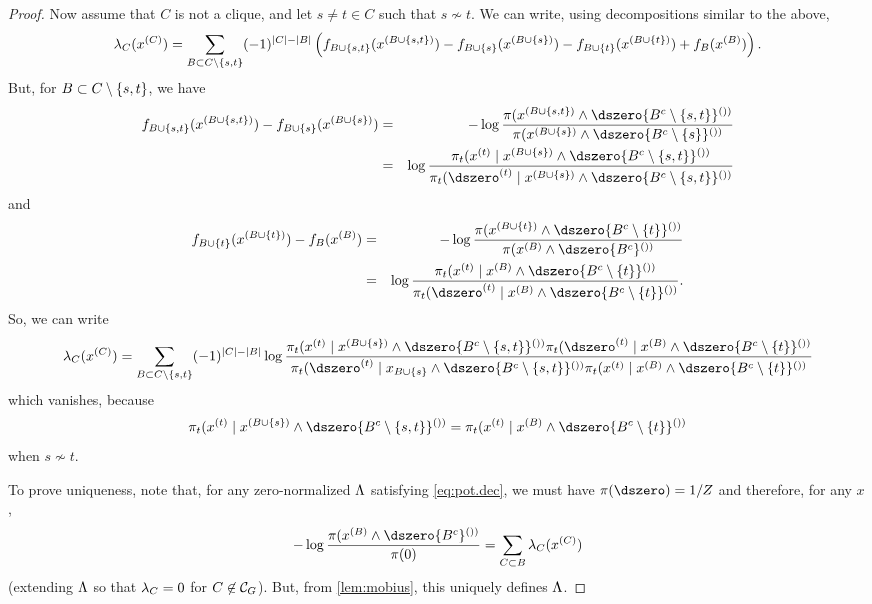 \begin{proof}
Now assume that $C$ is not a clique, and let $s\neq t\in C$ such that
$s\not\sim t$. We can write, using
decompositions similar to the above,
$$
\lambda_C(x^{(C)}) = \sum_{B \subset C\setminus\{s,t\}} (-1)^{|C|-|B|}
\left(f_{B\cup\{s,t\}}(x^{(B\cup\{s,t\})}) - f_{B\cup\{s\}}(x^{(B\cup\{s\})}) - f_{B\cup\{t\}}(x^{(B\cup\{t\})}) +
f_B(x^{(B)})\right).
$$
But, for $B \subset C\setminus\{s,t\}$, we have
\begin{eqnarray*}
f_{B\cup\{s,t\}}(\pe x{B\cup\{s,t\}}) - f_{B\cup\{s\}}(\pe x{B\cup\{s\}}) &=& -
\ln\frac{\pi(\pe x{B\cup\{s,t\}}\wedge
\pe \dszero{B^c\setm\{s,t\}})}{\pi(\pe x{B\cup\{s\}}\wedge \pe \dszero{B^c\setm\{s\}})}
\\
&=& \ln \frac{\pi_t(\pe xt\mid \pe x{B\cup\{s\}}\wedge
\pe \dszero{B^c\setm\{s,t\}})}{\pi_t(\pe \dszero t\mid \pe x{B\cup\{s\}}\wedge
\pe \dszero {B^c\setm\{s,t\}})}
\end{eqnarray*}
and 
\begin{eqnarray*}
f_{B\cup\{t\}}(\pe x{B\cup\{t\}}) - f_{B}(\pe xB) &=& -
\ln\frac{\pi(\pe x{B\cup\{t\}}\wedge
\pe \dszero {B^c\setm\{t\}})}{\pi(\pe x{B}\wedge \pe \dszero{B^c})}
\\
&=& \ln \frac{\pi_t(\pe x t\mid \pe x{B}\wedge
\pe \dszero {B^c\setm\{t\}})}{\pi_t(\pe \dszero t\mid \pe x{B}\wedge
\pe \dszero {B^c\setm\{t\}})}.
\end{eqnarray*}
So, we can write
$$
\la_C(\pe xC) = \sum_{B \sub C\setm\{s,t\}} (-1)^{|C|-|B|}
\ln \frac{\pi_t(\pe x t\mid \pe x {B\cup\{s\}}\wedge
\pe \dszero {B^c\setm\{s,t\}})\pi_t(\pe \dszero t\mid \pe x{B}\wedge
\pe \dszero{B^c\setm\{t\}})}{\pi_t(\pe \dszero t\mid x_{B\cup\{s\}}\wedge
\pe \dszero {B^c\setm\{s,t\}})\pi_t(\pe xt\mid \pe x{B}\wedge
\pe \dszero {B^c\setm\{t\}})}
$$
which vanishes, because
$$
\pi_t(\pe xt\mid \pe x{B\cup\{s\}}\wedge
\pe \dszero{B^c\setm\{s,t\}}) = \pi_t(\pe xt\mid \pe x{B}\wedge
\pe \dszero {B^c\setm\{t\}})
$$
when $s\not \sim t$.

To prove uniqueness, note that, for any zero-normalized $\Lambda$ satisfying
\cref{eq:pot.dec}, we must have $\pi(\dszero) = 1/Z$ and therefore, for any
$x$,
$$
-\ln \frac{\pi(\pe xB\wedge \pe \dszero {B^c})}{\pi(0)} = \sum_{C\sub B} \la_C(\pe x C)
$$
(extending $\Lambda$ so that $\lambda_C=0$ for $C\not\in {\mathcal C}_G$).
But, from  \cref{lem:mobius}, this uniquely defines $\Lambda$.
\end{proof}

